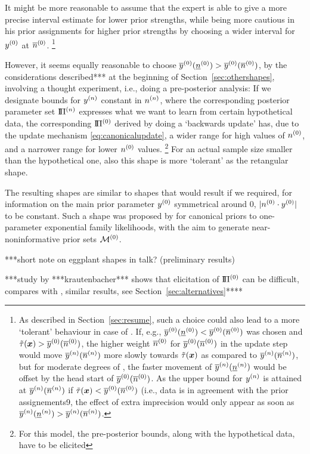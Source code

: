 It might be more reasonable to assume that the expert is able to give
a more precise interval estimate for lower prior strengths,
while being more cautious in his prior assignments for higher prior strengths
by choosing a wider interval for $y^{(0)}$ at $\overline{n}^{(0)}$.%
\footnote{As described in Section~\ref{sec:resume},
such a choice could also lead to a more `tolerant' behaviour in case of \pdc.
If, e.g., $\overline{y}^{(0)}(\underline{n}^{(0)}) < \overline{y}^{(0)}(\overline{n}^{(0)})$ was chosen and $\tilde{\tau}({\bm x}) > \overline{y}^{(0)}(\overline{n}^{(0)})$,
the higher weight $\overline{n}^{(0)}$ for $\overline{y}^{(0)}(\overline{n}^{(0)})$ in the update step
would move $\overline{y}^{(n)}(\overline{n}^{(n)})$ more slowly towards $\tilde{\tau}({\bm x})$ as compared to $\overline{y}^{(n)}(\overline{n}^{(n)})$,
but for moderate degrees of \pdc, the faster movement of $\overline{y}^{(n)}(\underline{n}^{(n)})$
would be offset by the head start of $\overline{y}^{(0)}(\overline{n}^{(0)})$.
As the upper bound for $y^{(n)}$ is attained at $\overline{y}^{(n)}(\overline{n}^{(n)})$
if $\tilde{\tau}({\bm x}) < \overline{y}^{(0)}(\overline{n}^{(0)})$ (i.e., data is in agreement with the prior assignements9,
the effect of extra imprecision would only appear as soon as $\overline{y}^{(n)}(\underline{n}^{(n)}) > \overline{y}^{(n)}(\overline{n}^{(n)})$.}

However, it seems equally reasonable to choose $\overline{y}^{(0)}(\underline{n}^{(0)}) > \overline{y}^{(0)}(\overline{n}^{(0)})$,
by the considerations described*** at the beginning of Section~\ref{sec:othershapes},
involving a thought experiment, i.e., doing a pre-posterior analysis:
If we designate bounds for $y^{(n)}$ constant in $n^{(n)}$,
where the corresponding posterior parameter set $\text{I}\!\Pi^{(n)}$
expresses what we want to learn from certain hypothetical data,
the corresponding $\text{I}\!\Pi^{(0)}$ derived by doing a `backwards update' has,
due to the update mechanism \eqref{eq:canonicalupdate},
a wider range for high values of $n^{(0)}$, and a narrower range for lower $n^{(0)}$ values.%
\footnote{For this model, the pre-posterior bounds, along with the hypothetical data, have to be elicited}
For an actual sample size smaller than the hypothetical one,
also this shape is more `tolerant' as the retangular shape.

The resulting shapes are similar to shapes that would result
if we required, for information on the main prior parameter $y^{(0)}$ symmetrical around $0$,
$|n^{(0)} \cdot y^{(0)}|$ to be constant.
Such a shape was proposed by \textcite{2012:benavolizaffalon}
for canonical priors to one-parameter exponential family likelihoods,
with the aim to generate near-noninformative prior sets $\mathcal{M}^{(0)}$.



***short note on eggplant shapes in talk? (preliminary results)


***study by ***krautenbacher*** shows that elicitation of $\text{I}\!\Pi^{(0)}$ can be difficult,
compares with \textcite{2005:whitcomb}, similar results, see Section~\ref{sec:alternatives}****

